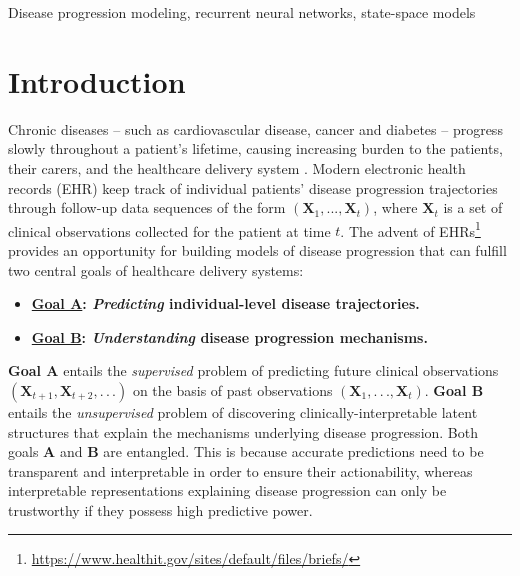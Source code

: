 \documentclass[twoside,11pt]{article}
\begin{document}
\begin{keywords}
Disease progression modeling, recurrent neural networks, state-space models
\end{keywords}

\section{Introduction}
\label{SSec1}
Chronic diseases -- such as cardiovascular disease, cancer and diabetes -- progress slowly throughout a patient's lifetime, causing increasing burden to the patients, their carers, and the healthcare delivery system \cite{sevick2007patients}. Modern electronic health records (EHR) keep track of individual patients' disease progression trajectories through follow-up data sequences of the form \mbox{\footnotesize $(\boldsymbol{X}_1, . . . , \boldsymbol{X}_t)$}, where \mbox{\footnotesize $\boldsymbol{X}_t$} is a set of clinical observations collected for the patient at time \mbox{\footnotesize $t$}. The advent of EHRs\footnote{\url{https://www.healthit.gov/sites/default/files/briefs/}} provides an opportunity for building models of disease progression that can fulfill two central goals of healthcare delivery systems:
\begin{itemize}
\item \textbf{\underline{Goal A}: \textit{Predicting} individual-level disease trajectories.} 
\item \textbf{\underline{Goal B}: \textit{Understanding} disease progression mechanisms.}   
\end{itemize} 
{\bf Goal A} entails the {\it supervised} problem of predicting future clinical observations \mbox{\footnotesize $(\boldsymbol{X}_{t+1},\boldsymbol{X}_{t+2},.\,.\,.)$} on the basis of past observations \mbox{\footnotesize $(\boldsymbol{X}_1,.\,.\,., \boldsymbol{X}_t)$}. {\bf Goal B} entails the {\it unsupervised} problem of discovering clinically-interpretable latent structures that explain the mechanisms underlying disease progression. Both goals {\bf A} and {\bf B} are entangled. This is because accurate predictions need to be transparent and interpretable in order to ensure their actionability, whereas interpretable representations explaining disease progression can only be trustworthy if they possess high predictive power. 
\end{document}
